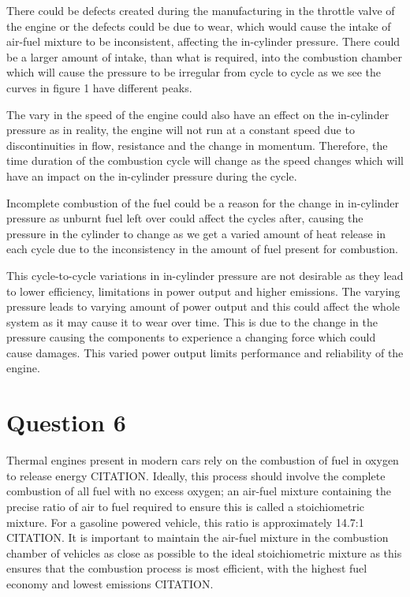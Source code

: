 \documentclass[11pt]{article}
\begin{document}
There could be defects created during the manufacturing in the throttle valve of the engine or the defects could be due to wear, which would cause the intake of air-fuel mixture to be inconsistent, affecting the in-cylinder pressure. There could be a larger amount of intake, than what is required, into the combustion chamber which will cause the pressure to be irregular from cycle to cycle as we see the curves in figure 1 have different peaks. 

The vary in the speed of the engine could also have an effect on the in-cylinder pressure as in reality, the engine will not run at a constant speed due to discontinuities in flow, resistance and the change in momentum. Therefore, the time duration of the combustion cycle will change as the speed changes which will have an impact on the in-cylinder pressure during the cycle.  

Incomplete combustion of the fuel could be a reason for the change in in-cylinder pressure as unburnt fuel left over could affect the cycles after, causing the pressure in the cylinder to change as we get a varied amount of heat release in each cycle due to the inconsistency in the amount of fuel present for combustion. 

This cycle-to-cycle variations in in-cylinder pressure are not desirable as they lead to lower efficiency, limitations in power output and higher emissions. The varying pressure leads to varying amount of power output and this could affect the whole system as it may cause it to wear over time. This is due to the change in the pressure causing the components to experience a changing force which could cause damages. This varied power output limits performance and reliability of the engine.  
\section{Question 6}
Thermal engines present in modern cars rely on the combustion of fuel in oxygen to release energy CITATION. Ideally, this process should involve the complete combustion of all fuel with no excess oxygen; an air-fuel mixture containing the precise ratio of air to fuel required to ensure this is called a stoichiometric mixture. For a gasoline powered vehicle, this ratio is approximately 14.7:1 CITATION. It is important to maintain the air-fuel mixture in the combustion chamber of vehicles as close as possible to the ideal stoichiometric mixture as this ensures that the combustion process is most efficient, with the highest fuel economy and lowest emissions CITATION.
\end{document}
